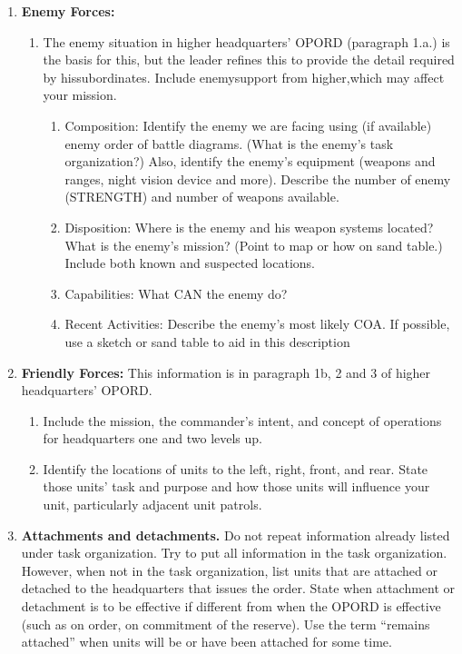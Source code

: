 \documentclass[letterpaper,tgtermes,9pt,microtype,colorlinks=true,urlcolor=blue,DIV=calc,pagesize]{scrartcl}
\begin{document}
\begin{enumerate}
\item \textbf{Enemy Forces:}
\label{sec:org1ddd9c7}
\begin{enumerate}
\item The enemy situation in higher headquarters’ OPORD (paragraph 1.a.) is the basis for this, but the leader refines this to provide the detail required by hissubordinates. Include enemysupport from higher,which may affect your mission.
\begin{enumerate}
\item Composition: Identify the enemy we are facing using (if available) enemy order of battle diagrams. (What is the enemy's task organization?) Also, identify the enemy's equipment (weapons and ranges, night vision device and more). Describe the number of enemy (STRENGTH) and number of weapons available.
\item Disposition: Where is the enemy and his weapon systems located? What is the enemy’s mission? (Point to map or how on sand table.) Include both known and suspected locations.
\item Capabilities: What CAN the enemy do?
\item Recent Activities: Describe the enemy's most likely COA. If possible, use a sketch or sand table to aid in this description
\end{enumerate}
\end{enumerate}
\item \textbf{Friendly Forces:}
\label{sec:orged74745}
This information is in paragraph 1b, 2 and 3 of higher headquarters’ OPORD.
\begin{enumerate}
\item Include the mission, the commander's intent, and concept of operations for
headquarters one and two levels up.
\item Identify the locations of units to the left, right, front, and rear. State
those units’ task and purpose and how those units will influence your unit, particularly adjacent unit patrols.
\end{enumerate}
\item \textbf{Attachments and detachments.}
\label{sec:org1d23598}
Do not repeat information already listed under task organization. Try to put all information in the task organization. However, when not in the task organization, list units that are attached or detached to the headquarters that issues the order. State when attachment or detachment is to be effective if different from when the OPORD is effective (such as on order, on commitment of the reserve). Use the term “remains attached” when units will be or have been attached for some time.
\end{enumerate}
\end{document}
